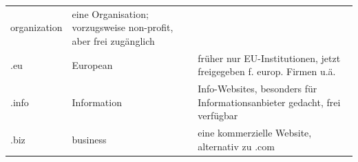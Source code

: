 \documentclass[]{book}
\theoremstyle{definition}
\theoremstyle{definition}
\theoremstyle{definition}
\theoremstyle{remark}
\begin{document}
\begin{longtable}[]{@{}lll@{}}
\begin{minipage}[t]{0.13\columnwidth}
organization \vspace{5mm}\strut
\end{minipage} & \begin{minipage}[t]{0.56\columnwidth}\raggedright\strut
eine Organisation; vorzugsweise non-profit, aber frei zugänglich
\vspace{5mm}\strut
\end{minipage}\tabularnewline
\begin{minipage}[t]{0.23\columnwidth}\raggedright\strut
.eu \vspace{5mm}\strut
\end{minipage} & \begin{minipage}[t]{0.13\columnwidth}\raggedright\strut
European \vspace{5mm}\strut
\end{minipage} & \begin{minipage}[t]{0.56\columnwidth}\raggedright\strut
früher nur EU-Institutionen, jetzt freigegeben f. europ. Firmen u.ä.
\vspace{5mm}\strut
\end{minipage}\tabularnewline
\begin{minipage}[t]{0.23\columnwidth}\raggedright\strut
.info \vspace{5mm}\strut
\end{minipage} & \begin{minipage}[t]{0.13\columnwidth}\raggedright\strut
Information \vspace{5mm}\strut
\end{minipage} & \begin{minipage}[t]{0.56\columnwidth}\raggedright\strut
Info-Websites, besonders für Informationsanbieter gedacht, frei
verfügbar \vspace{5mm}\strut
\end{minipage}\tabularnewline
\begin{minipage}[t]{0.23\columnwidth}\raggedright\strut
.biz \vspace{5mm}\strut
\end{minipage} & \begin{minipage}[t]{0.13\columnwidth}\raggedright\strut
business \vspace{5mm}\strut
\end{minipage} & \begin{minipage}[t]{0.56\columnwidth}\raggedright\strut
eine kommerzielle Website, alternativ zu .com \vspace{5mm}\strut
\end{minipage}\tabularnewline

\end{longtable}
\end{document}
